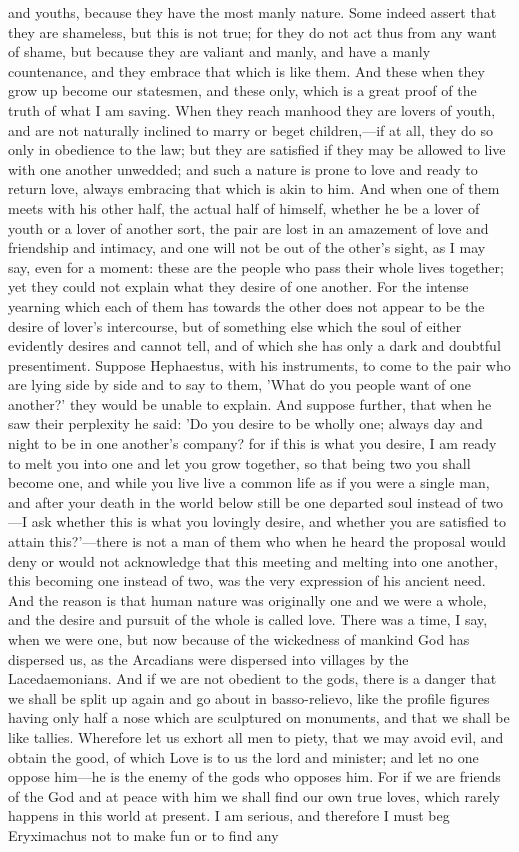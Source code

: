 and youths, because they have the most manly nature. Some indeed assert that they are shameless, but this is not true; for they do not act thus from any want of shame, but because they are valiant and manly, and have a manly countenance, and they embrace that which is like them. And these when they grow up become our statesmen, and these only, which is a great proof of the truth of what I am saving. When they reach manhood they are lovers of youth, and are not naturally inclined to marry or beget children,---if at all, they do so only in obedience to the law; but they are satisfied if they may be allowed to live with one another unwedded; and such a nature is prone to love and ready to return love, always embracing that which is akin to him. And when one of them meets with his other half, the actual half of himself, whether he be a lover of youth or a lover of another sort, the pair are lost in an amazement of love and friendship and intimacy, and one will not be out of the other's sight, as I may say, even for a moment: these are the people who pass their whole lives together; yet they could not explain what they desire of one another. For the intense yearning which each of them has towards the other does not appear to be the desire of lover's intercourse, but of something else which the soul of either evidently desires and cannot tell, and of which she has only a dark and doubtful presentiment. Suppose Hephaestus, with his instruments, to come to the pair who are lying side by side and to say to them, 'What do you people want of one another?' they would be unable to explain. And suppose further, that when he saw their perplexity he said: 'Do you desire to be wholly one; always day and night to be in one another's company? for if this is what you desire, I am ready to melt you into one and let you grow together, so that being two you shall become one, and while you live live a common life as if you were a single man, and after your death in the world below still be one departed soul instead of two---I ask whether this is what you lovingly desire, and whether you are satisfied to attain this?'---there is not a man of them who when he heard the proposal would deny or would not acknowledge that this meeting and melting into one another, this becoming one instead of two, was the very expression of his ancient need. And the reason is that human nature was originally one and we were a whole, and the desire and pursuit of the whole is called love. There was a time, I say, when we were one, but now because of the wickedness of mankind God has dispersed us, as the Arcadians were dispersed into villages by the Lacedaemonians. And if we are not obedient to the gods, there is a danger that we shall be split up again and go about in basso-relievo, like the profile figures having only half a nose which are sculptured on monuments, and that we shall be like tallies. Wherefore let us exhort all men to piety, that we may avoid evil, and obtain the good, of which Love is to us the lord and minister; and let no one oppose him---he is the enemy of the gods who opposes him. For if we are friends of the God and at peace with him we shall find our own true loves, which rarely happens in this world at present. I am serious, and therefore I must beg Eryximachus not to make fun or to find any 